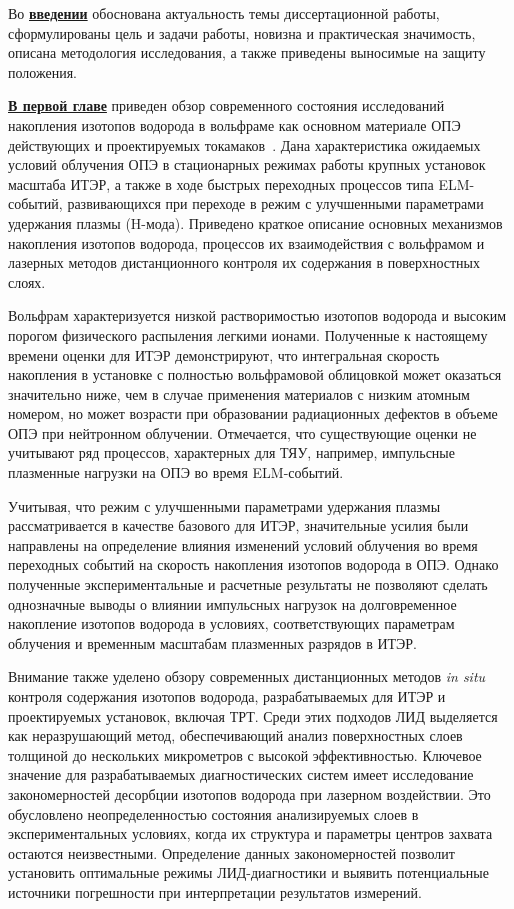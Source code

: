 Во \underline{\textbf{введении}} обоснована актуальность темы диссертационной работы, сформулированы цель и задачи работы, новизна и практическая значимость, описана методология исследования, а также приведены выносимые на защиту положения. 

\underline{\textbf{В первой главе}} приведен обзор современного состояния исследований накопления изотопов водорода в вольфраме как основном материале ОПЭ действующих и проектируемых токамаков~\cite{Roth2011,Pintsuk2012,Rieth2019}. Дана характеристика ожидаемых условий облучения ОПЭ в стационарных режимах работы крупных установок масштаба ИТЭР, а также в ходе быстрых переходных процессов типа ELM-событий, развивающихся при переходе в режим с улучшенными параметрами удержания плазмы (H-мода). Приведено краткое описание основных механизмов накопления изотопов водорода, процессов их взаимодействия с вольфрамом и лазерных методов дистанционного контроля их содержания в поверхностных слоях.

Вольфрам характеризуется низкой растворимостью изотопов водорода и высоким порогом физического распыления легкими ионами. Полученные к настоящему времени оценки для ИТЭР демонстрируют, что интегральная скорость накопления в установке с полностью вольфрамовой облицовкой может оказаться значительно ниже, чем в случае применения материалов с низким атомным номером, но может возрасти при образовании радиационных дефектов в объеме ОПЭ при нейтронном облучении. Отмечается, что существующие оценки не учитывают ряд процессов, характерных для ТЯУ, например, импульсные плазменные нагрузки на ОПЭ во время ELM-событий.

Учитывая, что режим с улучшенными параметрами удержания плазмы рассматривается в качестве базового для ИТЭР, значительные усилия были направлены на определение влияния изменений условий облучения во время переходных событий на скорость накопления изотопов водорода в ОПЭ. Однако полученные экспериментальные и расчетные результаты не позволяют сделать однозначные выводы о влиянии импульсных нагрузок на долговременное накопление изотопов водорода в условиях, соответствующих параметрам облучения и временным масштабам плазменных разрядов в ИТЭР.

Внимание также уделено обзору современных дистанционных методов \textit{in situ} контроля содержания изотопов водорода, разрабатываемых для ИТЭР и проектируемых установок, включая ТРТ. Среди этих подходов ЛИД выделяется как неразрушающий метод, обеспечивающий анализ поверхностных слоев толщиной до нескольких микрометров с высокой эффективностью. Ключевое значение для разрабатываемых диагностических систем имеет исследование закономерностей десорбции изотопов водорода при лазерном воздействии. Это обусловлено неопределенностью состояния анализируемых слоев в экспериментальных условиях, когда их структура и параметры центров захвата остаются неизвестными. Определение данных закономерностей позволит установить оптимальные режимы ЛИД-диагностики и выявить потенциальные источники погрешности при интерпретации результатов измерений.


